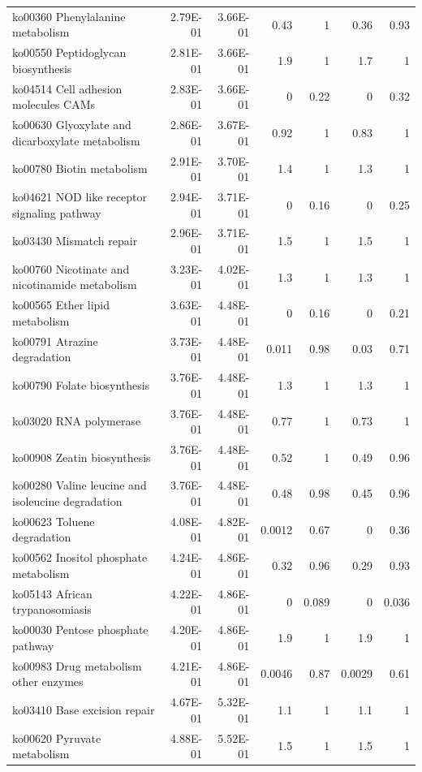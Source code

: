 {\begin{longtable}{ | l | r | r | r | r | r | r  | }
		ko00360 Phenylalanine metabolism & 2.79E-01 & 3.66E-01 & 0.43 & 1 & 0.36 & 0.93 \\ 
		ko00550 Peptidoglycan biosynthesis & 2.81E-01 & 3.66E-01 & 1.9 & 1 & 1.7 & 1 \\ 
		ko04514 Cell adhesion molecules CAMs  & 2.83E-01 & 3.66E-01 & 0 & 0.22 & 0 & 0.32 \\ 
		ko00630 Glyoxylate and dicarboxylate metabolism & 2.86E-01 & 3.67E-01 & 0.92 & 1 & 0.83 & 1 \\ 
		ko00780 Biotin metabolism & 2.91E-01 & 3.70E-01 & 1.4 & 1 & 1.3 & 1 \\ 
		ko04621 NOD like receptor signaling pathway & 2.94E-01 & 3.71E-01 & 0 & 0.16 & 0 & 0.25 \\ 
		ko03430 Mismatch repair & 2.96E-01 & 3.71E-01 & 1.5 & 1 & 1.5 & 1 \\ 
		ko00760 Nicotinate and nicotinamide metabolism & 3.23E-01 & 4.02E-01 & 1.3 & 1 & 1.3 & 1 \\ 
		ko00565 Ether lipid metabolism & 3.63E-01 & 4.48E-01 & 0 & 0.16 & 0 & 0.21 \\ 
		ko00791 Atrazine degradation & 3.73E-01 & 4.48E-01 & 0.011 & 0.98 & 0.03 & 0.71 \\ 
		ko00790 Folate biosynthesis & 3.76E-01 & 4.48E-01 & 1.3 & 1 & 1.3 & 1 \\ 
		ko03020 RNA polymerase & 3.76E-01 & 4.48E-01 & 0.77 & 1 & 0.73 & 1 \\ 
		ko00908 Zeatin biosynthesis & 3.76E-01 & 4.48E-01 & 0.52 & 1 & 0.49 & 0.96 \\ 
		ko00280 Valine leucine and isoleucine degradation & 3.76E-01 & 4.48E-01 & 0.48 & 0.98 & 0.45 & 0.96 \\ 
		ko00623 Toluene degradation & 4.08E-01 & 4.82E-01 & 0.0012 & 0.67 & 0 & 0.36 \\ 
		ko00562 Inositol phosphate metabolism & 4.24E-01 & 4.86E-01 & 0.32 & 0.96 & 0.29 & 0.93 \\ 
		ko05143 African trypanosomiasis & 4.22E-01 & 4.86E-01 & 0 & 0.089 & 0 & 0.036 \\ 
		ko00030 Pentose phosphate pathway & 4.20E-01 & 4.86E-01 & 1.9 & 1 & 1.9 & 1 \\ 
		ko00983 Drug metabolism other enzymes & 4.21E-01 & 4.86E-01 & 0.0046 & 0.87 & 0.0029 & 0.61 \\ 
		ko03410 Base excision repair & 4.67E-01 & 5.32E-01 & 1.1 & 1 & 1.1 & 1 \\ 
		ko00620 Pyruvate metabolism & 4.88E-01 & 5.52E-01 & 1.5 & 1 & 1.5 & 1 \\ 

\end{longtable}}
